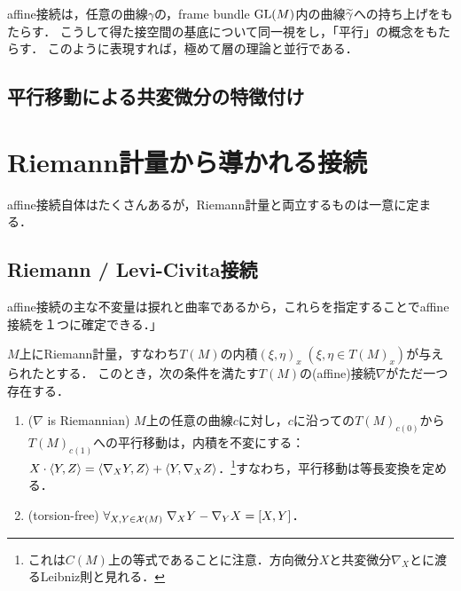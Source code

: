\documentclass[uplatex,dvipdfmx]{jsreport}
\begin{document}
\begin{remarks}
    affine接続は，任意の曲線$\gamma$の，frame bundle $\mathrm{GL}(M)$内の曲線$\widetilde{\gamma}$への持ち上げをもたらす．
    こうして得た接空間の基底について同一視をし，「平行」の概念をもたらす．
    このように表現すれば，極めて層の理論と並行である．
\end{remarks}

\subsection{平行移動による共変微分の特徴付け}

\section{Riemann計量から導かれる接続}

\begin{tcolorbox}[colframe=ForestGreen, colback=ForestGreen!10!white,breakable,colbacktitle=ForestGreen!40!white,coltitle=black,fonttitle=\bfseries\sffamily,
title=]
    affine接続自体はたくさんあるが，Riemann計量と両立するものは一意に定まる．
\end{tcolorbox}

\subsection{Riemann / Levi-Civita接続}

\begin{tcolorbox}[colframe=ForestGreen, colback=ForestGreen!10!white,breakable,colbacktitle=ForestGreen!40!white,coltitle=black,fonttitle=\bfseries\sffamily,
title=]
    affine接続の主な不変量は捩れと曲率であるから，これらを指定することでaffine接続を１つに確定できる．」
\end{tcolorbox}

\begin{theorem}
    $M$上にRiemann計量，すなわち$T(M)$の内積$(\xi,\eta)_x\;(\xi,\eta\in T(M)_x)$が与えられたとする．
    このとき，次の条件を満たす$T(M)$の(affine)接続$\nabla$がただ一つ存在する．
    \begin{enumerate}
        \item ($\nabla$ is Riemannian) $M$上の任意の曲線$c$に対し，$c$に沿っての$T(M)_{c(0)}$から$T(M)_{c(1)}$への平行移動は，内積を不変にする：$X\cdot\langle Y,Z\rangle=\langle\nabla_XY,Z\rangle+\langle Y,\nabla_XZ\rangle$．\footnote{これは$C(M)$上の等式であることに注意．方向微分$X$と共変微分$\nabla_X$とに渡るLeibniz則と見れる．}すなわち，平行移動は等長変換を定める．
        \item (torsion-free) $\forall_{X,Y\in\mathcal{X}(M)}\;\nabla_XY-\nabla_YX=[X,Y]$．
    \end{enumerate}
\end{theorem}
\end{document}
